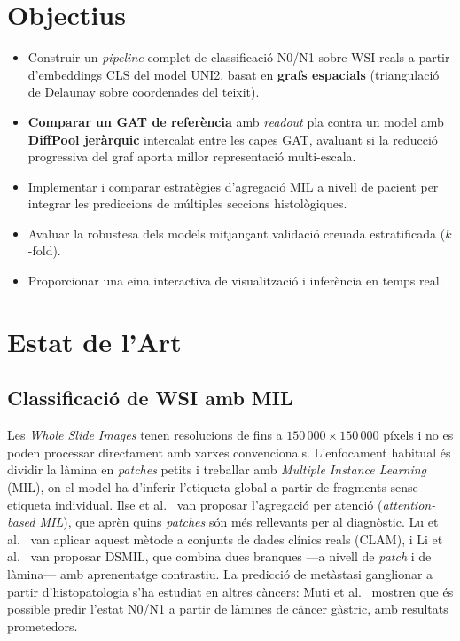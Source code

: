 \documentclass[10pt,a4paper,twocolumn,twoside]{article}
\begin{document}
\section{Objectius}

\begin{itemize}
    \item Construir un \textit{pipeline} complet de classificació N0/N1 sobre WSI reals a partir
    d'embeddings CLS del model UNI2, basat en \textbf{grafs espacials} (triangulació de Delaunay
    sobre coordenades del teixit).
    \item \textbf{Comparar un GAT de referència} amb \textit{readout} pla contra un model amb
    \textbf{DiffPool jeràrquic} intercalat entre les capes GAT, avaluant si la reducció
    progressiva del graf aporta millor representació multi-escala.
    \item Implementar i comparar estratègies d'agregació MIL a nivell de pacient per integrar
    les prediccions de múltiples seccions histològiques.
    \item Avaluar la robustesa dels models mitjançant validació creuada estratificada ($k$-fold).
    \item Proporcionar una eina interactiva de visualització i inferència en temps real.
\end{itemize}

\section{Estat de l'Art}

\subsection{Classificació de WSI amb MIL}

Les \textit{Whole Slide Images} tenen resolucions de fins a $150\,000 \times 150\,000$
píxels i no es poden processar directament amb xarxes convencionals. L'enfocament habitual
és dividir la làmina en \textit{patches} petits i treballar amb \textit{Multiple Instance
Learning} (MIL), on el model ha d'inferir l'etiqueta global a partir de fragments sense
etiqueta individual. Ilse et al.~\cite{ilse2018attentionbaseddeepmultipleinstance} van
proposar l'agregació per atenció (\textit{attention-based MIL}), que aprèn quins
\textit{patches} són més rellevants per al diagnòstic. Lu et al.~\cite{lu2020dataefficientweaklysupervised}
van aplicar aquest mètode a conjunts de dades clínics reals (CLAM), i Li et
al.~\cite{li2021dualstreammultipleinstancelearning} van proposar DSMIL, que combina dues
branques —a nivell de \textit{patch} i de làmina— amb aprenentatge contrastiu. La
predicció de metàstasi ganglionar a partir d'histopatologia s'ha estudiat en altres càncers:
Muti et al.~\cite{muti2023deep} mostren que és possible predir l'estat N0/N1 a partir de
làmines de càncer gàstric, amb resultats prometedors.
\end{document}
